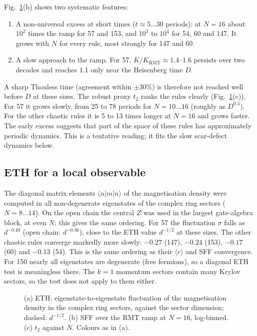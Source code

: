 Fig.~\ref{fig:ethsff}(b) shows two systematic features:
\begin{enumerate}
\item A non-universal excess at short times ($t\approx5\ldots30$ periods): at $N=16$ about $10^2$ times the ramp for 57
  and 153, and $10^3$ to $10^4$ for 54, 60 and 147. It grows with $N$ for every rule, most strongly for 147 and 60.
\item A slow approach to the ramp. For 57, $K/K_\mathrm{RMT}\approx1.4$--$1.6$ persists over two decades and reaches 1.1
  only near the Heisenberg time $D$.
\end{enumerate}
A sharp Thouless time (agreement within $\pm30\%$) is therefore not reached well before $D$ at these sizes. The robust
proxy $t_2$ ranks the rules clearly (Fig.~\ref{fig:ethsff}(c)). For 57 it grows slowly, from 25 to 78 periods for
$N=10\ldots16$ (roughly as $D^{0.3}$). For the other chaotic rules it is 5 to 13 times longer at $N=16$ and grows faster.
The early excess suggests that part of the space of these rules has approximately periodic dynamics. This is a tentative
reading; it fits the slow scar-defect dynamics below.

\subsection{ETH for a local observable}
The diagonal matrix elements $\langle n|m|n\rangle$ of the magnetisation density were computed in all non-degenerate
eigenstates of the complex ring sectors ($N=8\ldots14$). On the open chain the central $Z$ was used in the largest
gate-algebra block, at even $N$; this gives the same ordering. For 57 the fluctuation $\sigma$ falls as
$d^{-0.40}$ (open chain: $d^{-0.36}$), close to the ETH value $d^{-1/2}$ at these sizes. The other chaotic rules converge
markedly more slowly: $-0.27$ (147), $-0.24$ (153), $-0.17$ (60) and $-0.13$ (54). This is the same ordering as their
$\langle r\rangle$ and SFF convergence. For 150 nearly all eigenstates are degenerate (free fermions), so a diagonal ETH
test is meaningless there. The $k=1$ momentum sectors contain many Krylov sectors, so the test does not apply to them
either.

\begin{figure}[h]
\centering
{}
\caption{(a) ETH: eigenstate-to-eigenstate fluctuation of the magnetisation density in the complex ring sectors, against
the sector dimension; dashed: $d^{-1/2}$. (b) SFF over the RMT ramp at $N=16$, log-binned. (c) $t_2$ against $N$.
Colours as in (a).}
\label{fig:ethsff}
\end{figure}

